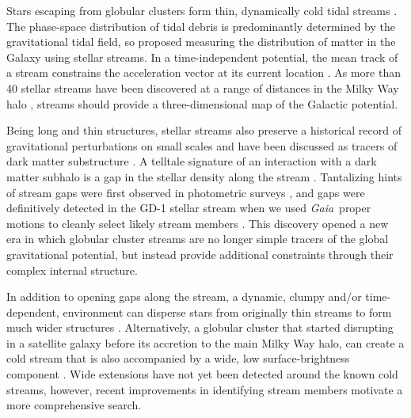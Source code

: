 \documentclass[twocolumn]{aastex62}
\newcommand{\gaia}{\textsl{Gaia}}
\begin{document}
%

Stars escaping from globular clusters form thin, dynamically cold tidal streams \citep[e.g.,][]{combes1999}.
The phase-space distribution of tidal debris is predominantly determined by the gravitational tidal field, so \citet{johnston1999} proposed measuring the distribution of matter in the Galaxy using stellar streams.
In a time-independent potential, the mean track of a stream constrains the acceleration vector at its current location \citep{bh2018}.
As more than 40 stellar streams have been discovered at a range of distances in the Milky Way halo \citep[see][for a recent review]{gc2016}, streams should provide a three-dimensional map of the Galactic potential.

Being long and thin structures, stellar streams also preserve a historical record of gravitational perturbations on small scales and have been discussed as tracers of dark matter substructure \citep[e.g.,][]{johnston2002, carlberg2009}.
A telltale signature of an interaction with a dark matter subhalo is a gap in the stellar density along the stream \citep[e.g.,][]{ibata2002, yoon2011, eb2015}.
Tantalizing hints of stream gaps were first observed in photometric surveys \citep[e.g.,][]{carlberg2012,cg2013}, and gaps were definitively detected in the GD-1 stellar stream \citep{gd2006} when we used \gaia\ proper motions to cleanly select likely stream members \citep{pwb}.
This discovery opened a new era in which globular cluster streams are no longer simple tracers of the global gravitational potential, but instead provide additional constraints  through their complex internal structure.

In addition to opening gaps along the stream, a dynamic, clumpy and/or time-dependent, environment can disperse stars from originally thin streams to form much wider structures \citep[e.g.,][]{bonaca2014, ngan2016, pw2016, pearson2017}.
Alternatively, a globular cluster that started disrupting in a satellite galaxy before its accretion to the main Milky Way halo, can create a cold stream that is also accompanied by a wide, low surface-brightness component \citep{carlberg2018}.
Wide extensions have not yet been detected around the known cold streams, however, recent improvements in identifying stream members motivate a more comprehensive search.
\end{document}
